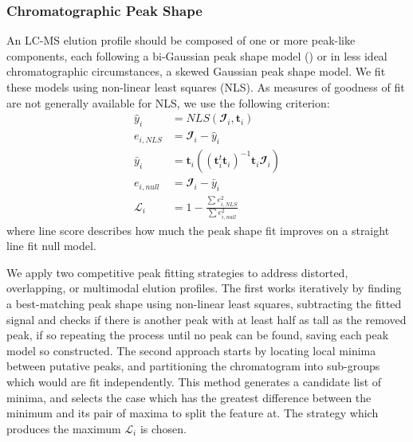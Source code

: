 \documentclass{article}
\begin{document}
    \subsubsection{Chromatographic Peak Shape}
        An LC-MS elution profile should be composed of one or more peak-like components, each
        following a bi-Gaussian peak shape model (\cite{Yu2010}) or in less ideal chromatographic
        circumstances, a skewed Gaussian peak shape model. We fit these models using non-linear
        least squares (NLS). As measures of goodness of fit are not generally available for NLS,
        we use the following criterion:
        \begin{align}
            {\hat y_i} &= NLS(\mathbfcal{I}_i, \mathbf{t}_i) \nonumber\\
            e_{i, NLS} &= \mathbfcal{I}_i - {\hat y_i} \nonumber\\
            {\bar y_i} &= \mathbf{t}_i
                \left(
                    \left(
                        \mathbf{t}_i^t\mathbf{t}_i
                    \right)^{-1}\mathbf{t}_i\mathbfcal{I}_i
                \right)\nonumber\\
            e_{i, null} &= \mathbfcal{I}_i - {\bar y_i} \nonumber\\
            \mathscr{L}_i &= 1 - \frac{\sum{e_{i, NLS}^2}}{\sum{e_{i, null}^2}}
        \end{align}
        \noindent where line score describes how much the peak shape fit improves on a straight
        line fit null model.

        We apply two competitive peak fitting strategies to address distorted, overlapping, or
        multimodal elution profiles. The first works iteratively by finding a best-matching peak
        shape using non-linear least squares, subtracting the fitted signal and checks if there is
        another peak with at least half as tall as the removed peak, if so repeating the process until
        no peak can be found, saving each peak model so constructed. The second approach starts
        by locating local minima between putative peaks, and partitioning the chromatogram into
        sub-groups which would are fit independently. This method generates a candidate list of
        minima, and selects the case which has the greatest difference between the minimum and its
        pair of maxima to split the feature at. The strategy which produces the maximum $\mathscr{L}_i$
        is chosen.
\end{document}
